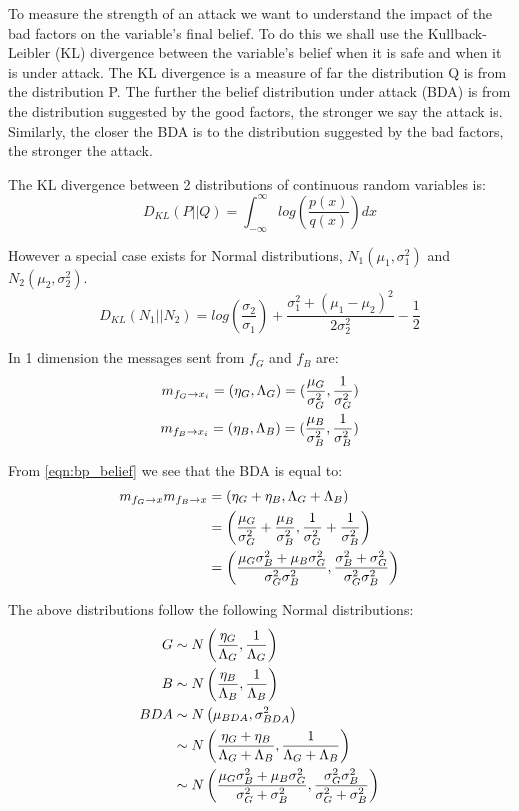 To measure the strength of an attack we want to understand the impact of the bad factors on the variable's final belief. To do this we shall use the Kullback-Leibler (KL) divergence \citationneeded between the variable's belief when it is safe and when it is under attack.
The KL divergence is a measure of far the distribution Q is from the distribution P. The further the belief distribution under attack (BDA) is from the distribution suggested by the good factors, the stronger we say the attack is. Similarly, the closer the BDA is to the distribution suggested by the bad factors, the stronger the attack.

The KL divergence between 2 distributions of continuous random variables is:
\begin{equation}
	D_{KL}(P || Q) = \int_{-\infty}^{\infty} log\left( \frac{p(x)}{q(x)} \right) dx
\end{equation}

However a special case exists for Normal distributions, $N_1(\mu_1, \sigma_1^2)$ and $N_2(\mu_2, \sigma_2^2)$.
\begin{equation}
	D_{KL}(N_1 || N_2) = log\left(\frac{\sigma_2}{\sigma_1}\right) + \frac{\sigma_1^2 + (\mu_1 - \mu_2)^2}{2\sigma_2^2} - \frac{1}{2}
\end{equation}

In 1 dimension the messages sent from $f_G$ and $f_B$ are:
\begin{eqnarray}
	m_{f_G \rightarrow x_i} = (\eta_G, \Lambda_G) = (\frac{\mu_G}{\sigma_G^2}, \frac{1}{\sigma_G^2})\\
	m_{f_B \rightarrow x_i} = (\eta_B, \Lambda_B) = (\frac{\mu_B}{\sigma_B^2}, \frac{1}{\sigma_B^2}) \label{eqn:attacker_msg}
\end{eqnarray}

From \autoref{eqn:bp_belief} we see that the BDA is equal to:
\begin{align}
	m_{f_G \rightarrow x} m_{f_B \rightarrow x} 
	&= (\eta_G + \eta_B, \Lambda_G + \Lambda_B)\\
	&= \left(\frac{\mu_G}{\sigma_G^2} + \frac{\mu_B}{\sigma_B^2}, \frac{1}{\sigma_G^2} + \frac{1}{\sigma_B^2}\right)\\
	&= \left(\frac{\mu_G\sigma_B^2 + \mu_B\sigma_G^2}{\sigma_G^2 \sigma_B^2}, \frac{\sigma_B^2 + \sigma_G^2}{\sigma_G^2 \sigma_B^2}\right)
\end{align}

The above distributions follow the following Normal distributions:
\begin{align}
	G &\sim N\left(\frac{\eta_G}{\Lambda_G}, \frac{1}{\Lambda_G}\right)\\
	B &\sim N\left(\frac{\eta_B}{\Lambda_B}, \frac{1}{\Lambda_B}\right)\\
	BDA &\sim N\left(\mu_{BDA}, \sigma_{BDA}^2\right)\\
	&\sim N\left(\frac{\eta_G + \eta_B}{\Lambda_G + \Lambda_B}, \frac{1}{\Lambda_G + \Lambda_B}\right)\\
	&\sim N\left(\frac{\mu_G\sigma_B^2 + \mu_B\sigma_G^2}{\sigma_G^2 + \sigma_B^2}, \frac{\sigma_G^2 \sigma_B^2}{\sigma_G^2 + \sigma_B^2}\right) \label{eqn:bda_distribution}
\end{align}

